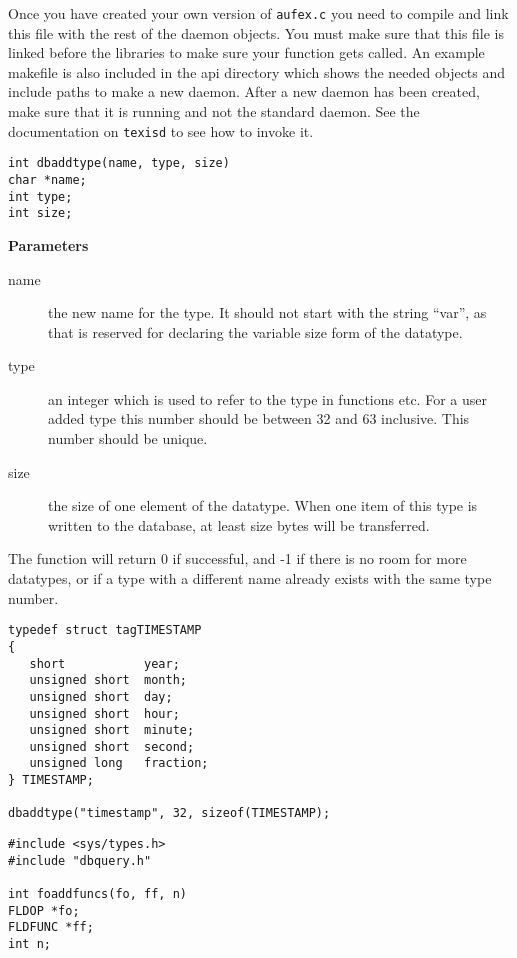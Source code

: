 Once you have created your own version of {\tt aufex.c} you need to
compile and link this file with the rest of the daemon objects.  You must
make sure that this file is linked before the libraries to make sure your
function gets called.  An example makefile is also included in the api
directory which shows the needed objects and include paths to make a new
daemon.  After a new daemon has been created, make sure that it is running
and not the standard daemon.  See the documentation on {\tt texisd} to see
how to invoke it.


\SYNOPSIS
\begin{verbatim}
int dbaddtype(name, type, size)
char *name;
int type;
int size;
\end{verbatim}

\DESCRIPTION
{\bf Parameters}
\begin{description}
\item[name] the new name for the type.  It should not start with the
string ``var'', as that is reserved for declaring the variable size
form of the datatype.
\item[type] an integer which is used to refer to the type in functions
etc.  For a user added type this number should be between 32 and 63
inclusive.  This number should be unique.
\item[size] the size of one element of the datatype.  When one item of
this type is written to the database, at least size bytes will be
transferred.
\end{description}

The function will return 0 if successful, and -1 if there is no room
for more datatypes, or if a type with a different name already exists
with the same type number.


\EXAMPLE
\begin{verbatim}
typedef struct tagTIMESTAMP
{
   short           year;
   unsigned short  month;
   unsigned short  day;
   unsigned short  hour;
   unsigned short  minute;
   unsigned short  second;
   unsigned long   fraction;
} TIMESTAMP;

dbaddtype("timestamp", 32, sizeof(TIMESTAMP);
\end{verbatim}


\SYNOPSIS
\begin{verbatim}
#include <sys/types.h>
#include "dbquery.h"

int foaddfuncs(fo, ff, n)
FLDOP *fo;
FLDFUNC *ff;
int n;
\end{verbatim}

